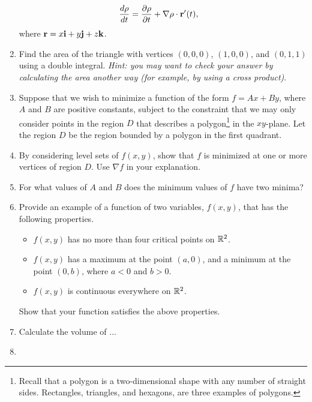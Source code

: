 \documentclass{article}
\begin{document}
\begin{enumerate}
\begin{align*}
  \frac{d\rho}{dt} &= \frac{\partial \rho}{\partial t} + \nabla \rho \cdot \mathbf{r}'(t),
\end{align*}
where $\mathbf{r} = x\mathbf{i}+y\mathbf{j}+z\mathbf{k}$.
\item %
Find the area of the triangle with vertices $(0,0,0)$, $(1,0,0)$, and $(0,1,1)$ using a double integral. \textit{Hint: you may want to check your answer by calculating the area another way (for example, by using a cross product)}.

\item %
Suppose that we wish to minimize a function of the form $f=Ax+By$, where $A$ and $B$ are positive constants, subject to the constraint that we may only consider points in the region $D$ that describes a polygon\footnote{Recall that a polygon is a two-dimensional shape with any number of straight sides. Rectangles, triangles, and hexagons, are three examples of polygons.} in the $xy$-plane. Let the region $D$ be the region bounded by a polygon in the first quadrant. 
\BEN
\item By considering level sets of $f(x,y)$, show that $f$ is minimized at one or more vertices of region $D$. Use $\nabla f$ in your explanation. 
\item For what values of $A$ and $B$ does the minimum values of $f$ have two minima? 
\EEN
\item %
Provide an example of a function of two variables, $f(x,y)$, that has the following properties. 
\begin{itemize}
  \item $f(x,y)$ has no more than four critical points on $\mathbb{R}^2$.
  \item $f(x,y)$ has a maximum at the point $(a,0)$, and a minimum at the point $(0,b)$, where $a<0$ and $b>0$.
  \item $f(x,y)$ is continuous everywhere on $\mathbb{R}^2$.
\end{itemize}
Show that your function satisfies the above properties. 

\item %
Calculate the volume of ...
\item %


\end{enumerate}
\end{document}
